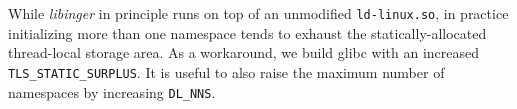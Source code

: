 While \textit{libinger} in principle runs on top of an unmodified
\texttt{ld-linux.so}, in
practice initializing more than one namespace tends to exhaust the
statically-allocated thread-local storage area.  As a workaround, we build
glibc with an increased \texttt{TLS\_STATIC\_SURPLUS}.  It is useful to also raise
the maximum number of namespaces by increasing \texttt{DL\_NNS}.
